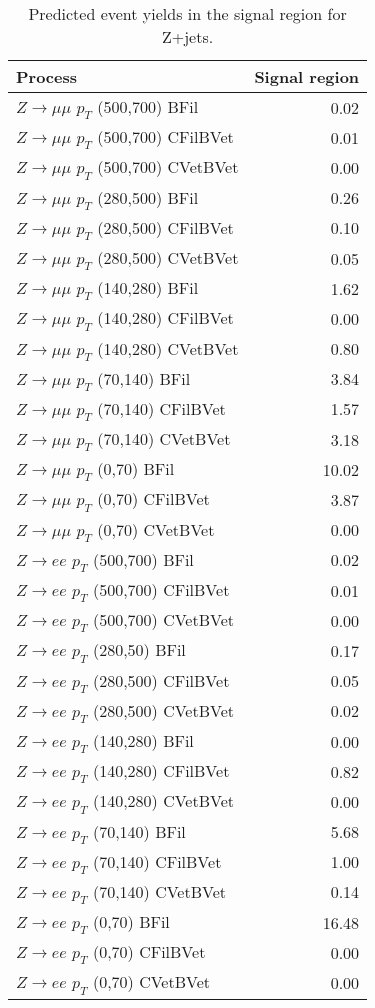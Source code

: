 \documentclass[10pt,twoside,a4paper]{article}
\begin{document}
 
\begin{table} [ht!]
\setlength{\tabcolsep}{2pt}
\footnotesize
\centering
\begin{tabular}{l | r}
\hline
\hline
Process & Signal region \\ 
\hline
$Z \rightarrow \mu \mu$ $p_T$ (500,700) BFil & 0.02 \\ 
$Z \rightarrow \mu \mu$ $p_T$ (500,700) CFilBVet & 0.01 \\ 
$Z \rightarrow \mu \mu$ $p_T$ (500,700) CVetBVet & 0.00 \\ 
$Z \rightarrow \mu \mu$ $p_T$ (280,500) BFil & 0.26 \\ 
$Z \rightarrow \mu \mu$ $p_T$ (280,500) CFilBVet & 0.10 \\ 
$Z \rightarrow \mu \mu$ $p_T$ (280,500) CVetBVet & 0.05 \\ 
$Z \rightarrow \mu \mu$ $p_T$ (140,280) BFil & 1.62 \\ 
$Z \rightarrow \mu \mu$ $p_T$ (140,280) CFilBVet & 0.00 \\ 
$Z \rightarrow \mu \mu$ $p_T$ (140,280) CVetBVet & 0.80 \\ 
$Z \rightarrow \mu \mu$ $p_T$ (70,140) BFil & 3.84 \\ 
$Z \rightarrow \mu \mu$ $p_T$ (70,140) CFilBVet & 1.57 \\ 
$Z \rightarrow \mu \mu$ $p_T$ (70,140) CVetBVet & 3.18 \\ 
$Z \rightarrow \mu \mu$ $p_T$ (0,70) BFil & 10.02 \\ 
$Z \rightarrow \mu \mu$ $p_T$ (0,70) CFilBVet & 3.87 \\ 
$Z \rightarrow \mu \mu$ $p_T$ (0,70) CVetBVet & 0.00 \\ 
$Z \rightarrow e e$ $p_T$ (500,700) BFil & 0.02 \\ 
$Z \rightarrow e e$ $p_T$ (500,700) CFilBVet & 0.01 \\ 
$Z \rightarrow e e$ $p_T$ (500,700) CVetBVet & 0.00 \\ 
$Z \rightarrow e e$ $p_T$ (280,50) BFil & 0.17 \\ 
$Z \rightarrow e e$ $p_T$ (280,500) CFilBVet & 0.05 \\ 
$Z \rightarrow e e$ $p_T$ (280,500) CVetBVet & 0.02 \\ 
$Z \rightarrow e e$ $p_T$ (140,280) BFil & 0.00 \\ 
$Z \rightarrow e e$ $p_T$ (140,280) CFilBVet & 0.82 \\ 
$Z \rightarrow e e$ $p_T$ (140,280) CVetBVet & 0.00 \\ 
$Z \rightarrow e e$ $p_T$ (70,140) BFil & 5.68 \\ 
$Z \rightarrow e e$ $p_T$ (70,140) CFilBVet & 1.00 \\ 
$Z \rightarrow e e$ $p_T$ (70,140) CVetBVet & 0.14 \\ 
$Z \rightarrow e e$ $p_T$ (0,70) BFil & 16.48 \\ 
$Z \rightarrow e e$ $p_T$ (0,70) CFilBVet & 0.00 \\ 
$Z \rightarrow e e$ $p_T$ (0,70) CVetBVet & 0.00 \\ 
\hline
\hline
\end{tabular}
\caption{Predicted event yields in the signal region for Z+jets.}
\label{tab:eventyield_Zjets}
\end{table}
\end{document}
